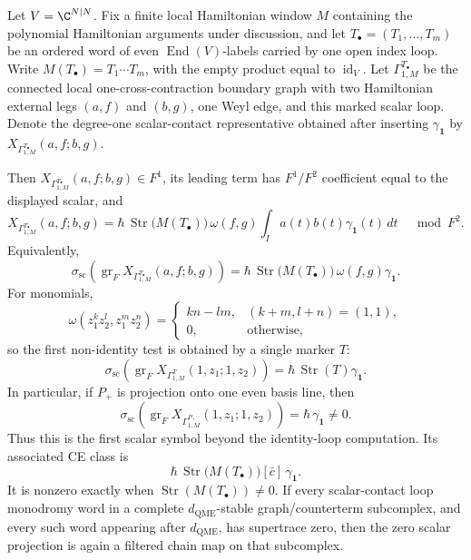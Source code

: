 \begin{prop}
\label{prop:app-first-nonidentity-loop-scalar-symbol}
  Let \(V=\C^{N|N}\).  Fix a finite local Hamiltonian window \(M\)
  containing the polynomial Hamiltonian arguments under discussion, and let
  \(T_\bullet=(T_1,\ldots,T_m)\) be an ordered word of even
  \(\operatorname{End}(V)\)-labels carried by one open index loop.  Write
  \(M(T_\bullet)=T_1\cdots T_m\), with the empty product equal to
  \(\operatorname{id}_V\).  Let
  \(\Gamma^{T_\bullet}_{1,M}\) be the connected local
  one-cross-contraction boundary graph with two Hamiltonian external legs
  \((a,f)\) and \((b,g)\), one Weyl edge, and this marked scalar loop.
  Denote the degree-one scalar-contact representative obtained after
  inserting \(\gamma_{\mathbf 1}\) by
  \(X_{\Gamma^{T_\bullet}_{1,M}}(a,f;b,g)\).

  Then
  \(X_{\Gamma^{T_\bullet}_{1,M}}(a,f;b,g)\in F^1\), its leading term has
  \(F^1/F^2\) coefficient equal to the displayed scalar, and
  \[
    X_{\Gamma^{T_\bullet}_{1,M}}(a,f;b,g)
      =
    \hbar\,\operatorname{Str}\!\bigl(M(T_\bullet)\bigr)\,
    \omega(f,g)\int_Ia(t)b(t)\gamma_{\mathbf 1}(t)\,dt
      \quad\bmod F^2 .
  \]
  Equivalently,
  \[
    \sigma_{\mathrm{sc}}\!\left(
      \operatorname{gr}_{F}
        X_{\Gamma^{T_\bullet}_{1,M}}(a,f;b,g)\right)
      =
    \hbar\,\operatorname{Str}\!\bigl(M(T_\bullet)\bigr)\,
    \omega(f,g)\gamma_{\mathbf 1}.
  \]
  For monomials,
  \[
    \omega(z_1^kz_2^l,z_1^mz_2^n)=
    \begin{cases}
      kn-lm,&(k+m,l+n)=(1,1),\\
      0,&\text{otherwise,}
    \end{cases}
  \]
  so the first non-identity test is obtained by a single marker \(T\):
  \[
    \sigma_{\mathrm{sc}}\!\left(
      \operatorname{gr}_{F}X_{\Gamma^{T}_{1,M}}(1,z_1;1,z_2)\right)
      =
    \hbar\,\operatorname{Str}(T)\gamma_{\mathbf 1}.
  \]
  In particular, if \(P_+\) is projection onto one even basis line, then
  \[
    \sigma_{\mathrm{sc}}\!\left(
      \operatorname{gr}_{F}X_{\Gamma^{P_+}_{1,M}}(1,z_1;1,z_2)\right)
      =
    \hbar\,\gamma_{\mathbf 1}\neq0.
  \]
  Thus this is the first scalar symbol beyond the identity-loop
  computation.  Its associated CE class is
  \[
    \hbar\,\operatorname{Str}\!\bigl(M(T_\bullet)\bigr)
    [\bar c]\,\gamma_{\mathbf 1}.
  \]
  It is nonzero exactly when
  \(\operatorname{Str}(M(T_\bullet))\neq0\).  If every scalar-contact
  loop monodromy word in a complete \(d_{\mathrm{QME}}\)-stable
  graph/counterterm subcomplex, and every such word appearing after
  \(d_{\mathrm{QME}}\), has supertrace zero, then the zero scalar
  projection is again a filtered chain map on that subcomplex.
\end{prop}


